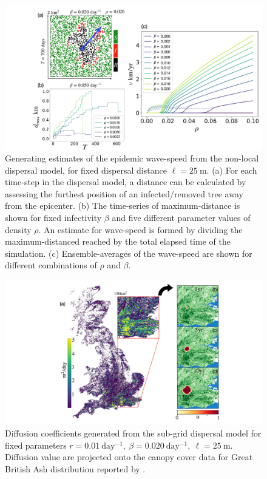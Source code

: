 \begin{figure}
    \centering
    \includegraphics[scale=0.25]{chapter7/figures/figure3x.pdf}
    \caption{Generating estimates of the epidemic wave-speed from the non-local dispersal model, for fixed dispersal distance $\ell = 25\ \mathrm{m}$. (a) For each time-step in the dispersal model, a distance can be calculated by assessing the furthest position of an infected/removed tree away from the epicenter. (b) The time-series of maximum-distance is shown for fixed infectivity $\beta$ and five different parameter values of density $\rho$. An estimate for wave-speed is formed by dividing the maximum-distanced reached by the total elapsed time of the simulation. (c) Ensemble-averages of the wave-speed are shown for different combinations of $\rho$ and $\beta$.}
    \label{fig:fkpp-sgm-vel}
\end{figure}

\begin{figure}
    \centering
    \includegraphics[scale=0.30]{chapter7/figures/figure4x.pdf}
    \caption{Diffusion coefficients generated from the sub-grid dispersal model for fixed parameters $r=0.01\ \mathrm{day^{-1}},\ \beta=0.020\ \mathrm{day^{-1}},\ \ell=25\ \mathrm{m}$. Diffusion value are projected onto the canopy cover data for Great British Ash distribution reported by \cite{hill.data}.}
    \label{fig:fkpp-diff}
\end{figure}

